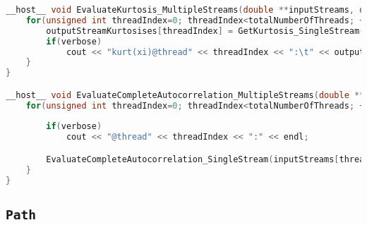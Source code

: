 \begin{lstlisting}[language=C++, caption={\texttt{libraries/CoreLibraries/RandomGenerator/CorrelationToolbox.cu}}]
__host__ void EvaluateKurtosis_MultipleStreams(double **inputStreams, double *inputStreamAverages, double *inputStreamVariances, double *outputStreamKurtosises, unsigned int totalNumberOfThreads, unsigned int numbersToGeneratePerThread, bool verbose){
	for(unsigned int threadIndex=0; threadIndex<totalNumberOfThreads; ++threadIndex){
		outputStreamKurtosises[threadIndex] = GetKurtosis_SingleStream(inputStreams[threadIndex], inputStreamAverages[threadIndex], inputStreamVariances[threadIndex], numbersToGeneratePerThread);
		if(verbose)
			cout << "kurt(xi)@thread" << threadIndex << ":\t" << outputStreamKurtosises[threadIndex] << endl;
	}
}

__host__ void EvaluateCompleteAutocorrelation_MultipleStreams(double **inputStreams, double **outputStreamCorrelations, unsigned int totalNumberOfThreads, unsigned int numbersToGeneratePerThread, bool verbose){
	for(unsigned int threadIndex=0; threadIndex<totalNumberOfThreads; ++threadIndex){
				
		if(verbose)
			cout << "@thread" << threadIndex << ":" << endl;

		EvaluateCompleteAutocorrelation_SingleStream(inputStreams[threadIndex], outputStreamCorrelations[threadIndex], numbersToGeneratePerThread, verbose);
	}
}
\end{lstlisting}

\subsection{\texttt{Path}}
\lipsum[1-3]

